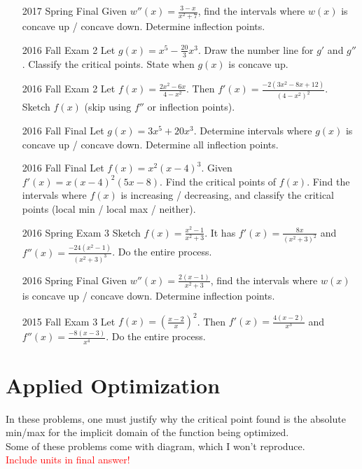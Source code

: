 \documentclass[10pt]{scrartcl}
\theoremstyle{definition}
\begin{document}
\begin{enumerate}
\item [2017 Spring Final] Given $w''(x) = \frac{3-x}{x^2 + 7}$, find the intervals where $w(x)$ is concave up / concave down. Determine inflection points.
\item [2016 Fall Exam 2] Let $g(x) = x^5 - \frac{20}{3} x^3$. Draw the number line for $g'$ and $g''$. Classify the critical points. State when $g(x)$ is concave up.
\item [2016 Fall Exam 2] Let $f(x) = \frac{2x^2-6x}{4-x^2}$. Then $f'(x) = \frac{-2(3x^2-8x+12)}{(4-x^2)^2}$. Sketch $f(x)$ (skip using $f''$ or inflection points).
\item [2016 Fall Final] Let $g(x) = 3x^5 + 20x^3$. Determine intervals where $g(x)$ is concave up / concave down. Determine all inflection points.
\item [2016 Fall Final] Let $f(x) = x^2 (x-4)^3$. Given $f'(x) = x(x-4)^2(5x-8)$. Find the critical points of $f(x)$. Find the intervals where $f(x)$ is increasing / decreasing, and classify the critical points (local min / local max / neither).
\item [2016 Spring Exam 3] Sketch $f(x) = \frac{x^2- 1}{x^2 + 3}$. It has $f'(x) = \frac{8x}{(x^2+3)^2}$ and $f''(x) = \frac{-24(x^2-1)}{(x^2+3)^3}$. Do the entire process.
\item [2016 Spring Final] Given $w''(x) = \frac{2(x-1)}{x^2 + 3}$, find the intervals where $w(x)$ is concave up / concave down. Determine inflection points.
\item [2015 Fall Exam 3] Let $f(x) = \left( \frac{x-2}{x} \right)^2$. Then $f'(x) = \frac{4(x-2)}{x^3}$ and $f''(x) = \frac{-8(x-3)}{x^4}$. Do the entire process.
\end{enumerate}

\newpage
\section{Applied Optimization}
In these problems, one must justify why the critical point found is the absolute min/max for the implicit domain of the function being optimized.\\
Some of these problems come with diagram, which I won't reproduce. \\
\textcolor{red}{Include units in final answer!}
\end{document}
